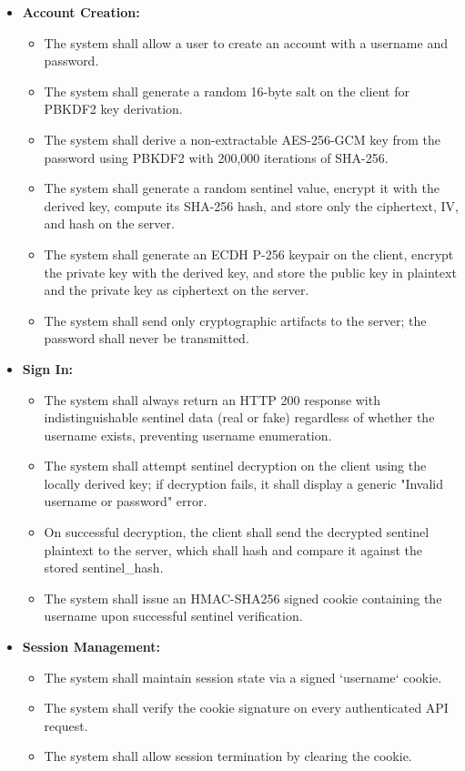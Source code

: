 \begin{itemize}
    \item \textbf{Account Creation:}
    \begin{itemize}
        \item The system shall allow a user to create an account with a username and password.
        \item The system shall generate a random 16-byte salt on the client for PBKDF2 key derivation.
        \item The system shall derive a non-extractable AES-256-GCM key from the password using PBKDF2 with 200,000 iterations of SHA-256.
        \item The system shall generate a random sentinel value, encrypt it with the derived key, compute its SHA-256 hash, and store only the ciphertext, IV, and hash on the server.
        \item The system shall generate an ECDH P-256 keypair on the client, encrypt the private key with the derived key, and store the public key in plaintext and the private key as ciphertext on the server.
        \item The system shall send only cryptographic artifacts to the server; the password shall never be transmitted.
    \end{itemize}

    \item \textbf{Sign In:}
    \begin{itemize}
        \item The system shall always return an HTTP 200 response with indistinguishable sentinel data (real or fake) regardless of whether the username exists, preventing username enumeration.
        \item The system shall attempt sentinel decryption on the client using the locally derived key; if decryption fails, it shall display a generic "Invalid username or password" error.
        \item On successful decryption, the client shall send the decrypted sentinel plaintext to the server, which shall hash and compare it against the stored sentinel\_hash.
        \item The system shall issue an HMAC-SHA256 signed cookie containing the username upon successful sentinel verification.
    \end{itemize}

    \item \textbf{Session Management:}
    \begin{itemize}
        \item The system shall maintain session state via a signed `username` cookie.
        \item The system shall verify the cookie signature on every authenticated API request.
        \item The system shall allow session termination by clearing the cookie.
    \end{itemize}
\end{itemize}


